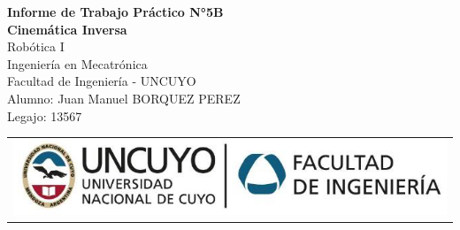 \documentclass[a4paper,12pt]{article}
\begin{document}
\begin{titlepage}
    \centering
    \vspace*{5cm}
    {\Huge\bfseries Informe de Trabajo Práctico N°5B}\\
    \vspace{0.2cm}
    {\Large \textbf{Cinemática Inversa}}\\
    \vspace{0.5cm}
    {\Large Robótica I}\\
    \vspace{0.5 cm}
    {\Large Ingeniería en Mecatrónica}\\
    \vspace{0.2 cm}
    {\Large Facultad de Ingeniería - UNCUYO}\\
    \vspace{1.5cm}
    Alumno: Juan Manuel BORQUEZ PEREZ\\
    Legajo: 13567\\
    \vfill
    {\begin{tabular}{@{}c@{}}\includegraphics[scale=0.4]{escudo.PNG}\end{tabular}}\hspace{10pt}
\end{titlepage}
\end{document}
